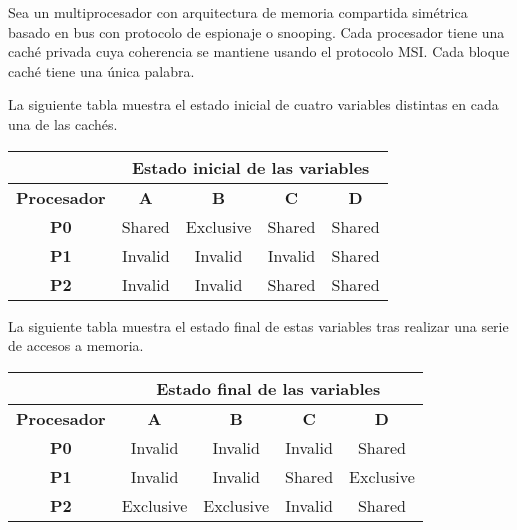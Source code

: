 \begin{acexercise}\end{acexercise}

Sea un multiprocesador con arquitectura de memoria compartida simétrica basado
en bus con protocolo de espionaje o snooping. Cada procesador tiene una caché
privada cuya coherencia se mantiene usando el protocolo MSI. Cada bloque caché
tiene una única palabra.  

La siguiente tabla muestra el estado inicial de cuatro variables distintas en
cada una de las cachés. 

\medskip

\begin{tabular}{|c|c|c|c|c|}
\hline
&
\multicolumn{4}{|c|}{Estado inicial de las variables}
\\
\hline

\textbf{Procesador} &
\textbf{A} &
\textbf{B} &
\textbf{C} &
\textbf{D}
\\
\hline
\hline

\textbf{P0} & 
Shared & Exclusive & Shared & Shared
\\
\hline

\textbf{P1} &
Invalid & Invalid & Invalid & Shared
\\
\hline

\textbf{P2} &
Invalid & Invalid & Shared & Shared
\\
\hline

\end{tabular}

\medskip

La siguiente tabla muestra el estado final de estas variables tras realizar una
serie de accesos a memoria. 

\medskip

\begin{tabular}{|c|c|c|c|c|}
\hline
&
\multicolumn{4}{|c|}{Estado final de las variables}
\\
\hline

\textbf{Procesador} &
\textbf{A} &
\textbf{B} &
\textbf{C} &
\textbf{D}
\\
\hline
\hline

\textbf{P0} & 
Invalid & Invalid & Invalid & Shared
\\
\hline

\textbf{P1} &
Invalid & Invalid & Shared & Exclusive
\\
\hline

\textbf{P2} &
Exclusive & Exclusive & Invalid & Shared
\\
\hline

\end{tabular}

